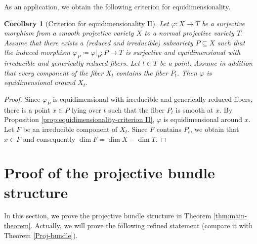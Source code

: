 \documentclass[english,reqno]{amsart}
\theoremstyle{plain}
\newtheorem{cor}[thm]{Corollary}
\theoremstyle{definition}
\newtheorem{remark}[thm]{Remark}
\numberwithin{equation}{section} %
\begin{document}
As an  application, we obtain  the following criterion for equidimensionality.

\begin{cor}[Criterion for equidimensionality II]
	\label{cor:equi-dim}
	Let $\varphi\colon X\rightarrow T$ be a surjective morphism  from a smooth projective  variety $X$  to a normal projective variety $T$.   Assume that there exists a (reduced and  irreducible) subvariety $P\subseteq X$  such that the induced morphism $\varphi_P\coloneqq \varphi\vert_P\colon P\rightarrow T$ is surjective and equidimensional with irreducible and generically reduced fibers. Let $t\in T$ be a point. Assume in addition that every component of the fiber $X_t$ contains the fiber $P_t$. Then $\varphi$ is equidimensional around $X_t$.
\end{cor}

\begin{proof}
	Since $\varphi_P$ is  equidimensional with irreducible and generically reduced fibers, there is a point $x\in P$ lying over $t$ such that the fiber $P_{t}$ is smooth at $x$. By Proposition \ref{prop:equidimensionality-criterion II}, $\varphi$ is equidimensional around $x$. Let $F$ be an irreducible component of $X_t$. Since $F$ contains $P_t$, we obtain that $x\in F$ and consequently $\dim F = \dim X -\dim T$.
\end{proof}








\baselineskip

\section{Proof of the projective bundle structure}
\label{section:bundle structure}



In this section, we   prove the   projective bundle structure in  Theorem \ref{thm:main-theorem}.  Actually, we will prove the following refined statement (compare it with Theorem \ref{Proj-bundle}).
\end{document}

